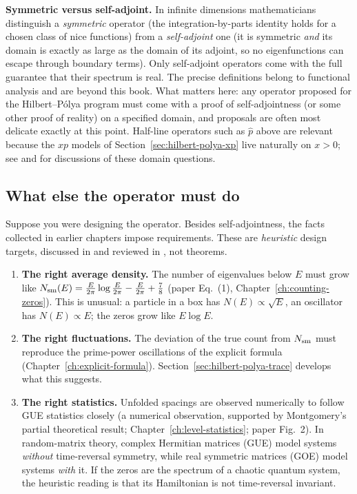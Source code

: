 \begin{beyond}
\textbf{Symmetric versus self-adjoint.} In infinite dimensions mathematicians distinguish a \emph{symmetric} operator (the integration-by-parts identity holds for a chosen class of nice functions) from a \emph{self-adjoint} one (it is symmetric \emph{and} its domain is exactly as large as the domain of its adjoint, so no eigenfunctions can escape through boundary terms). Only self-adjoint operators come with the full guarantee that their spectrum is real. The precise definitions belong to functional analysis and are beyond this book. What matters here: any operator proposed for the Hilbert--P\'olya program must come with a proof of self-adjointness (or some other proof of reality) on a specified domain, and proposals are often most delicate exactly at this point. Half-line operators such as $\hat p$ above are relevant because the $xp$ models of Section~\ref{sec:hilbert-polya-xp} live naturally on $x>0$; see \cite{sierra} and \cite{schumayer} for discussions of these domain questions.
\end{beyond}

\subsection{What else the operator must do}

Suppose you were designing the operator. Besides self-adjointness, the facts collected in earlier chapters impose requirements. These are \emph{heuristic} design targets, discussed in \cite{berrykeating99} and reviewed in \cite{schumayer}, not theorems.

\begin{enumerate}
\item \textbf{The right average density.} The number of eigenvalues below $E$ must grow like $N_{\mathrm{sm}}(E)=\frac{E}{2\pi}\log\frac{E}{2\pi}-\frac{E}{2\pi}+\frac78$ (paper Eq.~(1), Chapter~\ref{ch:counting-zeros}). This is unusual: a particle in a box has $N(E)\propto\sqrt E$, an oscillator has $N(E)\propto E$; the zeros grow like $E\log E$.
\item \textbf{The right fluctuations.} The deviation of the true count from $N_{\mathrm{sm}}$ must reproduce the prime-power oscillations of the explicit formula (Chapter~\ref{ch:explicit-formula}). Section~\ref{sec:hilbert-polya-trace} develops what this suggests.
\item \textbf{The right statistics.} Unfolded spacings are observed numerically to follow GUE statistics closely (a numerical observation, supported by Montgomery's partial theoretical result; Chapter~\ref{ch:level-statistics}; paper Fig.~2). In random-matrix theory, complex Hermitian matrices (GUE) model systems \emph{without} time-reversal symmetry, while real symmetric matrices (GOE) model systems \emph{with} it. If the zeros are the spectrum of a chaotic quantum system, the heuristic reading is that its Hamiltonian is not time-reversal invariant.
\end{enumerate}

